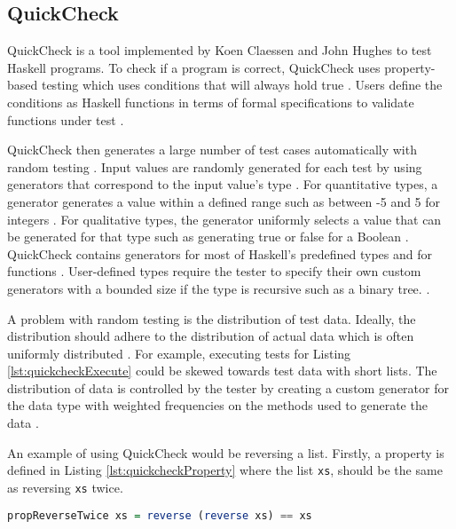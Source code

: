 \subsection{QuickCheck}
QuickCheck is a tool implemented by Koen Claessen and John Hughes \cite{QClightweight} to test Haskell programs.
To check if a program is correct, QuickCheck uses property-based testing which uses conditions that will always hold true \cite{QClightweight}.
Users define the conditions as Haskell functions in terms of formal specifications to validate functions under test \cite{QClightweight}. 

QuickCheck then generates a large number of test cases automatically with random testing \cite{QClightweight}. 
Input values are randomly generated for each test by using generators that correspond to the input value's type \cite{QClightweight}. 
For quantitative types, a generator generates a value within a defined range such as between -5 and 5 for integers \cite{QClightweight}. 
For qualitative types, the generator uniformly selects a value that can be generated for that type such as generating true or false for a Boolean \cite{QClightweight}.
QuickCheck contains generators for most of Haskell's predefined types and for functions \cite{QClightweight}. 
User-defined types require the tester to specify their own custom generators with a bounded size if the type is recursive such as a binary tree. \cite{QClightweight}. 

A problem with random testing is the distribution of test data. Ideally, the distribution should adhere to the distribution of actual data which is often uniformly distributed \cite{QClightweight}. 
For example, executing tests for Listing \ref{lst:quickcheckExecute} could be skewed towards test data with short lists. 
The distribution of data is controlled by the tester by creating a custom generator for the data type with weighted frequencies on the methods used to generate the data \cite{QClightweight}.

An example of using QuickCheck would be reversing a list.
Firstly, a property is defined in Listing \ref{lst:quickcheckProperty} where the list \texttt{xs}, should be the same as reversing \texttt{xs} twice.

\begin{lstlisting}[language=haskell, label={lst:quickcheckProperty},
caption={Property for reversing a list in QuickCheck}, captionpos=b, frame = single]
propReverseTwice xs = reverse (reverse xs) == xs
\end{lstlisting}

